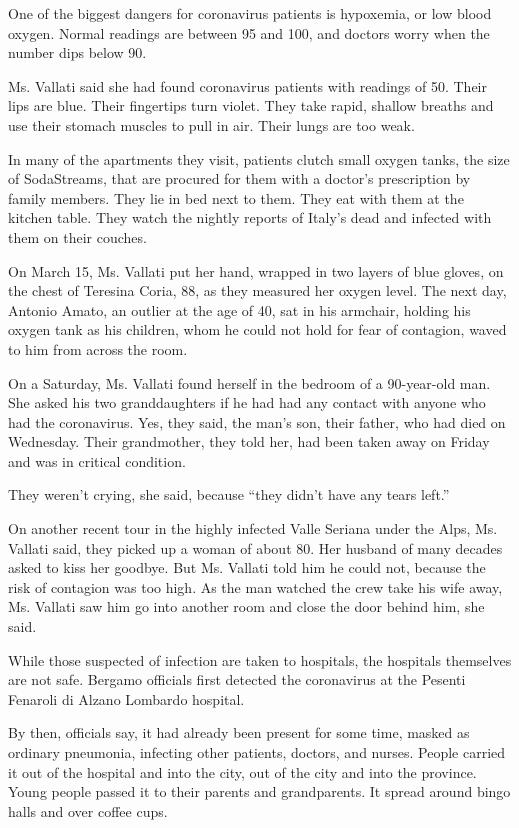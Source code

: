One of the biggest dangers for coronavirus patients is hypoxemia, or low
blood oxygen. Normal readings are between 95 and 100, and doctors worry
when the number dips below 90.

Ms. Vallati said she had found coronavirus patients with readings of 50.
Their lips are blue. Their fingertips turn violet. They take rapid,
shallow breaths and use their stomach muscles to pull in air. Their
lungs are too weak.

In many of the apartments they visit, patients clutch small oxygen
tanks, the size of SodaStreams, that are procured for them with a
doctor's prescription by family members. They lie in bed next to them.
They eat with them at the kitchen table. They watch the nightly reports
of Italy's dead and infected with them on their couches.

On March 15, Ms. Vallati put her hand, wrapped in two layers of blue
gloves, on the chest of Teresina Coria, 88, as they measured her oxygen
level. The next day, Antonio Amato, an outlier at the age of 40, sat in
his armchair, holding his oxygen tank as his children, whom he could not
hold for fear of contagion, waved to him from across the room.

On a Saturday, Ms. Vallati found herself in the bedroom of a 90-year-old
man. She asked his two granddaughters if he had had any contact with
anyone who had the coronavirus. Yes, they said, the man's son, their
father, who had died on Wednesday. Their grandmother, they told her, had
been taken away on Friday and was in critical condition.

They weren't crying, she said, because ``they didn't have any tears
left.''

On another recent tour in the highly infected Valle Seriana under the
Alps, Ms. Vallati said, they picked up a woman of about 80. Her husband
of many decades asked to kiss her goodbye. But Ms. Vallati told him he
could not, because the risk of contagion was too high. As the man
watched the crew take his wife away, Ms. Vallati saw him go into another
room and close the door behind him, she said.

While those suspected of infection are taken to hospitals, the hospitals
themselves are not safe. Bergamo officials first detected the
coronavirus at the Pesenti Fenaroli di Alzano Lombardo hospital.

By then, officials say, it had already been present for some time,
masked as ordinary pneumonia, infecting other patients, doctors, and
nurses. People carried it out of the hospital and into the city, out of
the city and into the province. Young people passed it to their parents
and grandparents. It spread around bingo halls and over coffee cups.


